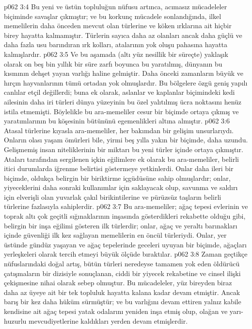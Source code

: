 \vs p062 3:4 Bu yeni ve üstün topluluğun nüfusu artınca, acımasız mücadeleler biçiminde savaşlar çıkmıştır; ve bu korkunç mücadele sonlandığında, ilkel memelilerin daha önceden mevcut olan türlerine ve köken ırklarına ait hiçbir birey hayatta kalmamıştır. Türlerin sayıca daha az olanları ancak daha güçlü ve daha fazla usu barındıran ırk kolları, atalarının yok oluşu pahasına hayatta kalmışlardır.
\vs p062 3:5 Ve bu aşamada (altı yüz nesillik bir süreçte) yaklaşık olarak on beş bin yıllık bir süre zarfı boyunca bu yaratılmış, dünyanın bu kısmının dehşet yayan varlığı haline gelmiştir. Daha önceki zamanların büyük ve hırçın hayvanlarının tümü ortadan yok olmuşlardır. Bu bölgelere özgü geniş yapılı canlılar etçil değillerdi; buna ek olarak, aslanlar ve kaplanlar biçimindeki kedi ailesinin daha iri türleri dünya yüzeyinin bu özel yalıtılmış ücra noktasını henüz istila etmemişti. Böylelikle bu ara\hyp{}memeliler cesur bir biçimde ortaya çıkmış ve yaratımlarının bu köşesinin bütününü egemenlikleri altına almıştır.
\vs p062 3:6 Atasal türlerine kıyasla ara\hyp{}memeliler, her bakımdan bir gelişim unsurlarıydı. Onların olası yaşam ömürleri bile, yirmi beş yılla yakın bir biçimde, daha uzundu. Gelişmemiş insan niteliklerinin bir miktarı bu yeni türler içinde ortaya çıkmıştır. Ataları tarafından sergilenen içkin eğilimlere ek olarak bu ara\hyp{}memeliler, belirli itici durumlarda iğrenme belirtisi göstermeye yetkinlerdi. Onlar daha ileri bir biçimde, oldukça belirgin bir biriktirme içgüdüsüne sahip olmuşlardır; onlar, yiyeceklerini daha sonraki kullanımlar için saklayacak olup, savunma ve saldırı için elverişli olan yuvarlak çakıl birikintilerine ve pürüzsüz taşların belirli türlerine fazlasıyla sahiplerdir.
\vs p062 3:7 Bu ara\hyp{}memeliler; ağaç tepesi evlerinin ve toprak altı çok geçitli sığınaklarının inşasında gösterdikleri rekabette olduğu gibi, belirgin bir inşa eğilimi gösteren ilk türlerdir; onlar, ağaç ve yeraltı barınakları içinde güvenliği ilk kez sağlayan memelilerin en öncül türleriydi. Onlar, yer üstünde gündüz yaşayan ve ağaç tepelerinde geceleri uyuyan bir biçimde, ağaçları yerleşkeleri olarak tercih etmeyi büyük ölçüde bıraktılar.
\vs p062 3:8 Zaman geçtikçe nüfuslarındaki doğal artış, bütün türleri neredeyse tamamen yok eden öldürücü çatışmaların bir dizisiyle sonuçlanan, ciddi bir yiyecek rekabetine ve cinsel ilişki çekişmesine nihai olarak sebep olmuştur. Bu mücadeleler, yüz bireyden biraz daha az üyeye ait bir tek topluluk hayatta kalana kadar devam etmiştir. Ancak barış bir kez daha hüküm sürmüştür; ve bu varlığını devam ettiren yalnız kabile kendisine ait ağaç tepesi yatak odalarını yeniden inşa etmiş olup, olağan ve yarı\hyp{}huzurlu mevcudiyetlerine kaldıkları yerden devam etmişlerdir.
